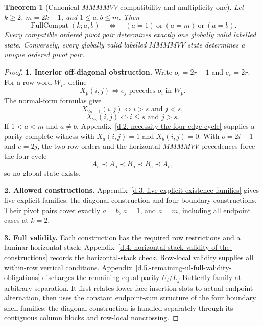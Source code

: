 \documentclass[11pt]{article}
\newtheorem{theorem}{Theorem}[section]
\theoremstyle{definition}
\theoremstyle{remark}
\begin{document}
\begin{theorem}[Canonical $MMMMVV$ compatibility and multiplicity one]\label{obj:T2}
Let \(k\ge2\), \(m=2k-1\), and \(1\le a,b\le m\). Then \[
\operatorname{FullCompat}(k;a,b)
\quad\Longleftrightarrow\quad
(a=1)\ \text{or}\ (a=m)\ \text{or}\ (a=b).
\] Every compatible ordered pivot pair determines exactly one globally
valid labelled state. Conversely, every globally valid labelled
\(MMMMVV\) state determines a unique ordered pivot pair.
\end{theorem}
\begin{proof}


\textbf{1. Interior off-diagonal obstruction.} Write \(o_r=2r-1\) and
\(e_r=2r\). For a row word \(W_p\), define \[
X_p(i,j)\iff e_j\text{ precedes }o_i\text{ in }W_p.
\] The normal-form formulas give \[
X_{2s-1}(i,j)\iff i>s\text{ and }j<s,
\] \[
X_{2s}(i,j)\iff i\le s\text{ and }j>s.
\] If \(1<a<m\) and \(a\ne b\), Appendix~\ref{d.2.-necessity-the-four-edge-cycle} supplies a parity-complete
witness with \(X_a(i,j)=1\) and \(X_b(i,j)=0\). With \(o=2i-1\) and
\(e=2j\), the two row orders and the horizontal \(MMMMVV\) precedences
force the four-cycle \[
A_e\prec A_o\prec B_o\prec B_e\prec A_e,
\] so no global state exists.

\textbf{2. Allowed constructions.} Appendix~\ref{d.3.-five-explicit-existence-families} gives five explicit
families: the diagonal construction and four boundary constructions.
Their pivot pairs cover exactly \(a=b\), \(a=1\), and \(a=m\), including
all endpoint cases at \(k=2\).

\textbf{3. Full validity.} Each construction has the required row
restrictions and a laminar horizontal stack; Appendix~\ref{d.4.-horizontal-stack-validity-of-the-constructions} records the horizontal-stack check. Row-local validity supplies all within-row vertical conditions. Appendix~\ref{d.5.-remaining-ul-full-validity-obligations} discharges the remaining equal-parity $U_i/L_j$ Butterfly family at arbitrary separation. It first relates lower-face insertion slots to actual endpoint alternation, then uses the constant endpoint-sum structure of the four boundary shell families; the diagonal construction is handled separately through its contiguous column blocks and row-local noncrossing.


\end{proof}
\end{document}
